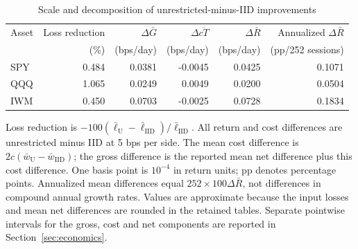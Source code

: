 \begin{table}[!htbp]\centering\small\setlength{\tabcolsep}{7pt}
\caption{Scale and decomposition of unrestricted-minus-IID improvements}\label{tab:scale}
\begin{tabular}{lrrrrr}\toprule
Asset & Loss reduction & $\Delta\bar G$ & $\Delta\overline{cT}$ & $\Delta\bar R$ & Annualized $\Delta\bar R$\\
 & (\%) & (bps/day) & (bps/day) & (bps/day) & (pp/252 sessions)\\\midrule
SPY & 0.484 & 0.0381 & -0.0045 & 0.0425 & 0.1071\\
QQQ & 1.065 & 0.0249 & 0.0049 & 0.0200 & 0.0504\\
IWM & 0.450 & 0.0703 & -0.0025 & 0.0728 & 0.1834\\
\bottomrule\end{tabular}
\par\smallskip\parbox{0.98\linewidth}{\footnotesize Loss reduction is $-100(\bar\ell_{\mathrm U}-\bar\ell_{\mathrm{IID}})/\bar\ell_{\mathrm{IID}}$. All return and cost differences are unrestricted minus IID at 5 bps per side. The mean cost difference is $2c(\bar w_{\mathrm U}-\bar w_{\mathrm{IID}})$; the gross difference is the reported mean net difference plus this cost difference. One basis point is $10^{-4}$ in return units; pp denotes percentage points. Annualized mean differences equal $252\times100\Delta\bar R$, not differences in compound annual growth rates. Values are approximate because the input losses and mean net differences are rounded in the retained tables. Separate pointwise intervals for the gross, cost and net components are reported in Section~\ref{sec:economics}.}
\end{table}








